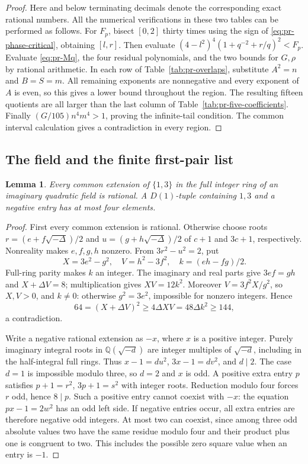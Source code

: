 \documentclass[12pt]{article}
\newtheorem{lemma}[theorem]{Lemma}
\numberwithin{equation}{section}
\begin{document}
\begin{proof}
Here and below terminating decimals denote the corresponding exact
rational numbers. All the numerical verifications in these two tables
can be performed as follows. For \(F_p\), bisect \([0,2]\) thirty times
using the sign of \eqref{eq:pr-phase-critical}, obtaining \([l,r]\).
Then evaluate
\((4-l^2)^4(1+q^{-2}+r/q)^2<F_p\).
Evaluate \eqref{eq:pr-Mq}, the four residual polynomials, and the two
bounds for \(G,\rho\) by rational arithmetic. In each row of
Table~\ref{tab:pr-overlaps}, substitute \(A^2=n\) and \(B=S=m\).
All remaining exponents are nonnegative and every exponent of \(A\)
is even, so this gives a lower bound throughout the region. The
resulting fifteen quotients are all larger than the last column of
Table~\ref{tab:pr-five-coefficients}. Finally
\((G/105)n^4m^4>1\), proving the infinite-tail condition. The common
interval calculation gives a contradiction in every region.
\end{proof}

\subsection{The field and the finite first-pair list}

\begin{lemma}\label{lem:pr-one-three}
Every common extension of $\{1,3\}$ in the full integer ring of an
imaginary quadratic field is rational. A $D(1)$-tuple containing
$1,3$ and a negative entry has at most four elements.
\end{lemma}
\begin{proof}
First every common extension is rational. Otherwise choose roots
\(r=(e+f\sqrt{-\Delta})/2\) and
\(u=(g+h\sqrt{-\Delta})/2\) of \(c+1\) and \(3c+1\), respectively.
Nonreality makes \(e,f,g,h\) nonzero. From \(3r^2-u^2=2\), put
\[
 X=3e^2-g^2,\quad V=h^2-3f^2,\quad k=(eh-fg)/2.
\]
Full-ring parity makes \(k\) an integer. The imaginary and real parts
give \(3ef=gh\) and \(X+\Delta V=8\); multiplication gives
\(XV=12k^2\). Moreover
\(V=3f^2X/g^2\), so \(X,V>0\), and \(k\ne0\): otherwise
\(g^2=3e^2\), impossible for nonzero integers. Hence
\[
 64=(X+\Delta V)^2\ge4\Delta XV=48\Delta k^2\ge144,
\]
a contradiction.

Write a negative rational extension as \(-x\), where \(x\) is a
positive integer. Purely imaginary integral roots in
\(\mathbb Q(\sqrt{-d})\) are integer multiples of \(\sqrt{-d}\),
including in the half-integral full rings. Thus
\(x-1=du^2\), \(3x-1=dv^2\), and \(d\mid2\).
The case \(d=1\) is impossible modulo three, so \(d=2\) and \(x\)
is odd. A positive extra entry \(p\) satisfies
\(p+1=r^2\), \(3p+1=s^2\) with integer roots. Reduction modulo four
forces \(r\) odd, hence \(8\mid p\). Such a positive entry cannot
coexist with \(-x\): the equation \(px-1=2w^2\) has an odd left
side. If negative entries occur, all extra entries are therefore
negative odd integers. At most two can coexist, since among three
odd absolute values two have the same residue modulo four and their
product plus one is congruent to two. This includes the possible zero square value when an entry is $-1$.
\end{proof}
\end{document}
